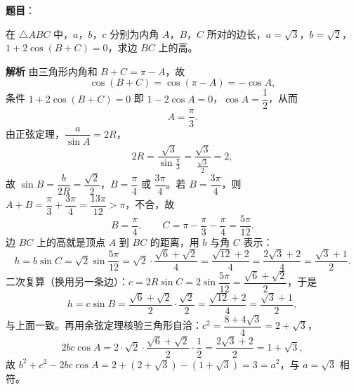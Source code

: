 \begin{answer}

\end{answer}
\begin{answer}

\textbf{题目}：

在 $\triangle ABC$ 中，$a$，$b$，$c$ 分别为内角 $A$，$B$，$C$ 所对的边长，$a=\sqrt3$，$b=\sqrt2$，$1+2\cos(B+C)=0$，求边 $BC$ 上的高。

\textbf{解析}
由三角形内角和 $B+C=\pi-A$，故
\nopagebreak[4]
\[
\cos(B+C)=\cos(\pi-A)=-\cos A,
\]
条件 $1+2\cos(B+C)=0$ 即 $1-2\cos A=0$，$\cos A=\dfrac12$，从而
\nopagebreak[4]
\[
A=\frac{\pi}{3}.
\]
由正弦定理，$\dfrac{a}{\sin A}=2R$，
\nopagebreak[4]
\[
2R=\frac{\sqrt3}{\sin\frac{\pi}{3}}=\frac{\sqrt3}{\frac{\sqrt3}{2}}=2,
\]
故 $\sin B=\dfrac{b}{2R}=\dfrac{\sqrt2}{2}$，$B=\dfrac{\pi}{4}$ 或 $\dfrac{3\pi}{4}$。若 $B=\dfrac{3\pi}{4}$，则 $A+B=\dfrac{\pi}{3}+\dfrac{3\pi}{4}=\dfrac{13\pi}{12}>\pi$，不合，故
\nopagebreak[4]
\[
B=\frac{\pi}{4},\qquad C=\pi-\frac{\pi}{3}-\frac{\pi}{4}=\frac{5\pi}{12}.
\]
边 $BC$ 上的高就是顶点 $A$ 到 $BC$ 的距离，用 $b$ 与角 $C$ 表示：
\nopagebreak[4]
\[
h=b\sin C=\sqrt2\sin\frac{5\pi}{12}=\sqrt2\cdot\frac{\sqrt6+\sqrt2}{4}=\frac{\sqrt{12}+2}{4}=\frac{2\sqrt3+2}{4}=\frac{\sqrt3+1}{2}.
\]
二次复算（换用另一条边）：$c=2R\sin C=2\sin\dfrac{5\pi}{12}=\dfrac{\sqrt6+\sqrt2}{2}$，于是
\nopagebreak[4]
\[
h=c\sin B=\frac{\sqrt6+\sqrt2}{2}\cdot\frac{\sqrt2}{2}=\frac{\sqrt{12}+2}{4}=\frac{\sqrt3+1}{2},
\]
与上面一致。再用余弦定理核验三角形自洽：$c^2=\dfrac{8+4\sqrt3}{4}=2+\sqrt3$，
\nopagebreak[4]
\[
2bc\cos A=2\cdot\sqrt2\cdot\frac{\sqrt6+\sqrt2}{2}\cdot\frac12=\frac{2\sqrt3+2}{2}=1+\sqrt3,
\]
故 $b^2+c^2-2bc\cos A=2+\left(2+\sqrt3\right)-\left(1+\sqrt3\right)=3=a^2$，与 $a=\sqrt3$ 相符。


\end{answer}
